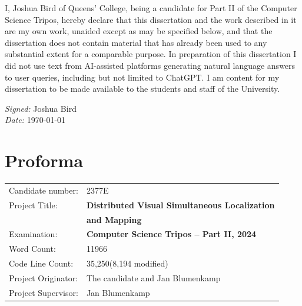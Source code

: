 \documentclass[12pt,a4paper,twoside,openright]{report}
\begin{document}
I, Joshua Bird of Queens' College, being a candidate for Part II of the Computer Science Tripos, hereby declare that this dissertation and the work described in it are my own work, unaided except as may be specified below, and that the dissertation does not contain material that has already been used to any substantial extent for a comparable purpose. In preparation of this dissertation I did not use text from AI-assisted platforms generating natural language answers to user queries, including but not limited to ChatGPT. I am content for my dissertation to be made available to the students and staff of the University.

\emph{Signed:} Joshua Bird\\
\emph{Date:} \today

\chapter*{Proforma}
 {\large
  \begin{tabular}{ll}
	  Candidate number:   & 2377E                                                   \\
	  Project Title:      & \bf Distributed Visual Simultaneous Localization        \\
	                      & \bf and Mapping                                         \\
	  Examination:        & \bf Computer Science Tripos -- Part II, 2024            \\
	  Word Count:         & 11966\footnotemark[1]                                   \\
	  Code Line Count:    & 35,250\footnotemark[2] (8,194 modified\footnotemark[3]) \\
	  Project Originator: & The candidate and Jan Blumenkamp                        \\
	  Project Supervisor: & Jan Blumenkamp                                          \\
  \end{tabular}
 }
\end{document}
